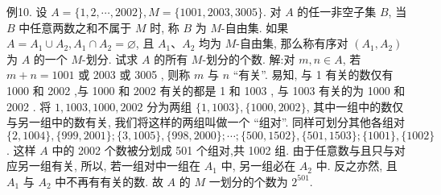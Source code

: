 例10. 设 $A=\{1,2, \cdots, 2002\}, M=\{1001,2003,3005\}$. 对 $A$ 的任一非空子集 $B$, 当 $B$ 中任意两数之和不属于 $M$ 时, 称 $B$ 为 $M$-自由集.
如果 $A= A_1 \cup A_2, A_1 \cap A_2=\varnothing$, 且 $A_1 、 A_2$ 均为 $M$-自由集, 那么称有序对 $\left(A_1, A_2\right)$ 为 $A$ 的一个 $M$-划分.
试求 $A$ 的所有 $M$-划分的个数.
解:对 $m, n \in A$, 若 $m+n=1001$ 或 2003 或 3005 , 则称 $m$ 与 $n$ “有关”.
易知, 与 1 有关的数仅有 1000 和 2002 ,与 1000 和 2002 有关的都是 1 和 1003 , 与 1003 有关的为 1000 和 2002 .
将 $1,1003,1000,2002$ 分为两组 $\{1,1003\},\{1000,2002\}$, 其中一组中的数仅与另一组中的数有关, 我们将这样的两组叫做一个 “组对”. 同样可划分其他各组对 $\{2,1004\},\{999,2001\} ;\{3,1005\},\{998,2000\} ; \cdots ;\{500,1502\},\{501,1503\} ;\{1001\},\{1002\}$.
这样 $A$ 中的 2002 个数被分划成 501 个组对,共 1002 组.
由于任意数与且只与对应另一组有关, 所以, 若一组对中一组在 $A_1$ 中, 另一组必在 $A_2$ 中.
反之亦然, 且 $A_1$ 与 $A_2$ 中不再有有关的数.
故 $A$ 的 $M$ 一划分的个数为 $2^{501}$.


